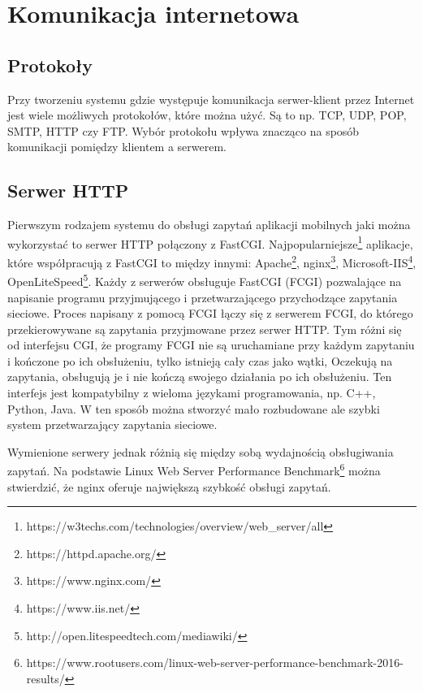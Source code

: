 \documentclass{report}
\begin{document}
		\section{Komunikacja internetowa}
		
			\subsection{Protokoły}
			Przy tworzeniu systemu gdzie występuje komunikacja serwer-klient przez Internet jest wiele możliwych protokołów, które można użyć. Są to np. TCP, UDP, POP, SMTP, HTTP czy FTP. Wybór protokołu wpływa znacząco na sposób komunikacji pomiędzy klientem a serwerem.
	
			\subsection{Serwer HTTP}
			Pierwszym rodzajem systemu do obsługi zapytań aplikacji mobilnych jaki można wykorzystać to serwer HTTP połączony z FastCGI. Najpopularniejsze\footnote{https://w3techs.com/technologies/overview/web\_server/all} aplikacje, które współpracują z FastCGI to między innymi: Apache\footnote{https://httpd.apache.org/}, nginx\footnote{https://www.nginx.com/}, Microsoft-IIS\footnote{https://www.iis.net/}, OpenLiteSpeed\footnote{http://open.litespeedtech.com/mediawiki/}. Każdy z serwerów obsługuje FastCGI (FCGI) pozwalające na napisanie programu przyjmującego i przetwarzającego przychodzące zapytania sieciowe. Proces napisany z pomocą FCGI łączy się z serwerem FCGI, do którego przekierowywane są zapytania przyjmowane przez serwer HTTP. Tym różni się od interfejsu CGI, że programy FCGI nie są uruchamiane przy każdym zapytaniu i kończone po ich obsłużeniu, tylko istnieją cały czas jako wątki, Oczekują na zapytania, obsługują je i nie kończą swojego działania po ich obsłużeniu. Ten interfejs jest kompatybilny z wieloma językami programowania, np. C++, Python, Java. W ten sposób można stworzyć mało rozbudowane ale szybki system przetwarzający zapytania sieciowe.
		
			Wymienione serwery jednak różnią się między sobą wydajnością obsługiwania zapytań. Na podstawie Linux Web Server Performance Benchmark\footnote{https://www.rootusers.com/linux-web-server-performance-benchmark-2016-results/} można stwierdzić, że nginx oferuje największą szybkość obsługi zapytań.
	
\end{document}
